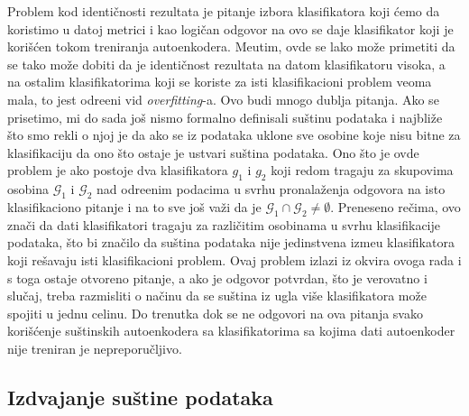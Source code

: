 \documentclass{article}
\begin{document}
	Problem kod identi\v cnosti rezultata je pitanje izbora klasifikatora koji \'cemo da koristimo u datoj metrici i kao logi\v can odgovor na ovo se daje klasifikator koji je kori\v s\'cen tokom treniranja autoenkodera.
	Me\dj utim, ovde se lako mo\v ze primetiti da se tako mo\v ze dobiti da je identi\v cnost rezultata na datom klasifikatoru visoka, a na ostalim klasifikatorima koji se koriste za isti klasifikacioni problem veoma mala, to jest odre\dj eni vid \emph{overfitting}-a. 
	Ovo budi mnogo dublja pitanja.
	Ako se prisetimo, mi do sada jo\v s nismo formalno definisali su\v stinu podataka i najbli\v ze \v sto smo rekli o njoj je da ako se iz podataka uklone sve osobine koje nisu bitne za klasifikaciju da ono \v sto ostaje je ustvari su\v stina podataka.
	Ono \v sto je ovde problem je ako postoje dva klasifikatora $g_1$ i $g_2$ koji redom tragaju za skupovima osobina $\mathcal{G}_1$ i $\mathcal{G}_2$ nad odre\dj enim podacima u svrhu pronala\v zenja odgovora na isto klasifikaciono pitanje i na to sve jo\v s va\v zi da je $\mathcal{G}_1 \cap \mathcal{G}_2 \ne \emptyset$.
	Preneseno re\v cima, ovo zna\v ci da dati klasifikatori tragaju za razli\v citim osobinama u svrhu klasifikacije podataka, \v sto bi zna\v cilo da su\v stina podataka nije jedinstvena izme\dj u klasifikatora koji re\v savaju isti klasifikacioni problem.
	Ovaj problem izlazi iz okvira ovoga rada i s toga ostaje otvoreno pitanje, a ako je odgovor potvrdan, \v sto je verovatno i slu\v caj, treba razmisliti o na\v cinu da se su\v stina iz ugla vi\v se klasifikatora mo\v ze spojiti u jednu celinu.
	Do trenutka dok se ne odgovori na ova pitanja svako kori\v s\'cenje su\v stinskih autoenkodera sa klasifikatorima sa kojima dati autoenkoder nije treniran je nepreporu\v cljivo.
	
	\subsection{Izdvajanje su\v stine podataka}
	
\end{document}
